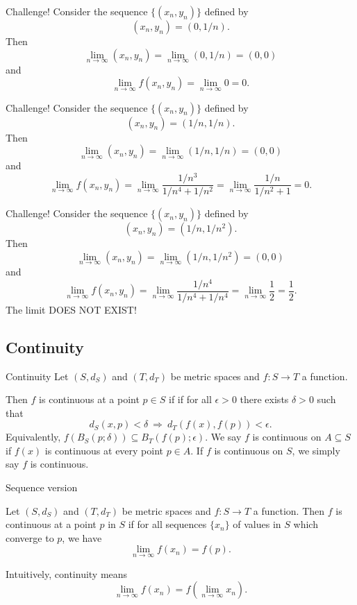 \documentclass{beamer}
\begin{document}
\begin{frame}{Challenge!}
Consider the sequence $\{(x_n,y_n)\}$ defined by
$$(x_n,y_n) = (0,1/n).$$
\pause
Then
$$\lim_{n\rightarrow \infty} (x_n,y_n) = \lim_{n\rightarrow \infty} (0,1/n) = (0,0)$$
\pause
and
$$\lim_{n\rightarrow \infty} f(x_n,y_n) = \lim_{n\rightarrow \infty} 0 = 0.$$
\end{frame}

\begin{frame}{Challenge!}
Consider the sequence $\{(x_n,y_n)\}$ defined by
$$(x_n,y_n) = (1/n,1/n).$$
\pause
Then
$$\lim_{n\rightarrow \infty} (x_n,y_n) = \lim_{n\rightarrow \infty} (1/n,1/n) = (0,0)$$
\pause
and
$$\lim_{n\rightarrow \infty} f(x_n,y_n) = \lim_{n\rightarrow \infty} \frac{1/n^3}{1/n^4+1/n^2} = \lim_{n\rightarrow \infty} \frac{1/n}{1/n^2+1} = 0.$$
\end{frame}

\begin{frame}{Challenge!}
Consider the sequence $\{(x_n,y_n)\}$ defined by
$$(x_n,y_n) = (1/n,1/n^2).$$
\pause
Then
$$\lim_{n\rightarrow \infty} (x_n,y_n) = \lim_{n\rightarrow \infty} (1/n,1/n^2) = (0,0)$$
\pause
and
$$\lim_{n\rightarrow \infty} f(x_n,y_n) = \lim_{n\rightarrow \infty} \frac{1/n^4}{1/n^4+1/n^4} = \lim_{n\rightarrow \infty} \frac{1}{2} = \frac{1}{2}.$$
\pause
{\color{red}The limit DOES NOT EXIST!}
\end{frame}

\subsection{Continuity}

\begin{frame}{Continuity}
Let $(S,d_S)$ and $(T,d_T)$ be metric spaces and $f: S\rightarrow T$ a function.
\pause
\begin{defn}
\pause
Then $f$ is continuous at a point $p\in S$ if 
if for all $\epsilon > 0$ there exists $\delta > 0$ such that
$$d_S(x,p) < \delta\ \Rightarrow\ d_T(f(x),f(p)) < \epsilon.$$
\pause
Equivalently, $f(B_S(p;\delta))\subseteq B_T(f(p);\epsilon)$.
\pause
We say $f$ is continuous on $A\subseteq S$ if $f(x)$ is continuous at every point $p\in A$.
\pause
If $f$ is continuous on $S$, we simply say $f$ is continuous.
\end{defn}
\end{frame}

\begin{frame}{Sequence version}
\pause
\begin{thm}
Let $(S,d_S)$ and $(T,d_T)$ be metric spaces and $f: S\rightarrow T$ a function.
\pause
Then $f$ is continuous at a point $p$ in $S$ if for all sequences $\{x_n\}$ of values in $S$ which converge to $p$, we have
\pause
$$\lim_{n\rightarrow\infty} f(x_n) = f(p).$$
\end{thm}
\pause
Intuitively, continuity means
$$\lim_{n\rightarrow\infty} f(x_n) = f\left(\lim_{n\rightarrow\infty} x_n\right).$$
\end{frame}
\end{document}

